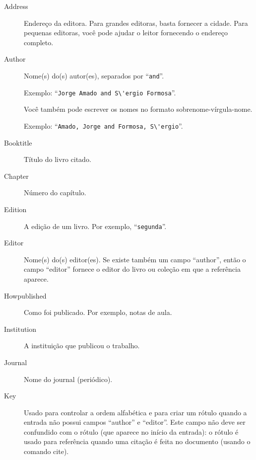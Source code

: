 \documentclass[article,openany]{memoir}
\begin{document}
\begin{description}
\item[Address]

Endereço da editora. Para grandes editoras, basta fornecer a
cidade. Para pequenas editoras, você pode ajudar o leitor fornecendo o
endereço completo.

\item[Author]

Nome(s) do(s) autor(es), separados por ``\verb/and/''. 

Exemplo: ``\verb/Jorge Amado and S\'ergio Formosa/''. 

Você também pode escrever os nomes no formato sobrenome-vírgula-nome.

Exemplo: ``\verb/Amado, Jorge and Formosa, S\'ergio/''.

\item[Booktitle]

Título do livro citado.

\item[Chapter]

Número do capítulo.

\item[Edition]

A edição de um livro. Por exemplo, ``\verb/segunda/''.

\item[Editor]


Nome(s) do(s) editor(es). Se existe também um campo ``author'', então
o campo ``editor'' fornece o editor do livro ou coleção em que a
referência aparece.

\item[Howpublished]

Como foi publicado. Por exemplo, notas de aula.

\item[Institution]

A instituição que publicou o trabalho.

\item[Journal]

Nome do journal (periódico).

\item[Key]

Usado para controlar a ordem alfabética e para criar um rótulo quando
a entrada não possui campos ``author'' e ``editor''. Este campo não
deve ser confundido com o rótulo (que aparece no início da entrada): o
rótulo é usado para referência quando uma citação é feita no documento
(usando o comando cite).


\end{description}
\end{document}
